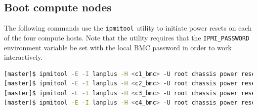 \documentclass[letterpaper]{article}
\begin{document}




\subsection{Boot compute nodes}

 
The following commands use the \texttt{ipmitool} utility to initiate power
resets on each of the four compute hosts. Note that the utility requires that
the \texttt{IPMI\_PASSWORD} environment variable be set with the local BMC password in
order to work interactively.


\begin{lstlisting}[language=bash,keywords={},upquote=true]
[master]$ ipmitool -E -I lanplus -H <c1_bmc> -U root chassis power reset   # power cycle c1
[master]$ ipmitool -E -I lanplus -H <c2_bmc> -U root chassis power reset   # power cycle c2
[master]$ ipmitool -E -I lanplus -H <c3_bmc> -U root chassis power reset   # power cycle c3
[master]$ ipmitool -E -I lanplus -H <c4_bmc> -U root chassis power reset   # power cycle c4
\end{lstlisting} 
\end{document}

